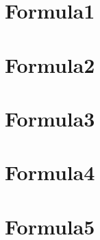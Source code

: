 \documentclass[12pt,a4paper]{article}
\begin{document}
    \section{Formula1}
    

    \section{Formula2}
    

    \section{Formula3}
    

    \section{Formula4}
    

    \section{Formula5}
    
\end{document}
